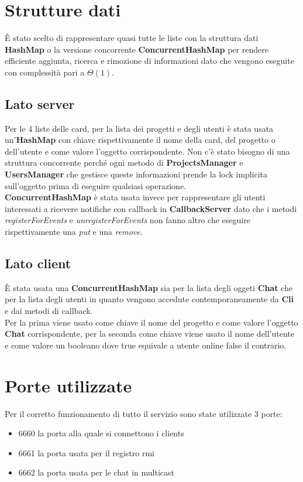 \documentclass[11pt]{report}
\begin{document}
	\section{Strutture dati}
	È stato scelto di rappresentare quasi tutte le liste con la struttura dati \textbf{HashMap} o la versione concorrente \textbf{ConcurrentHashMap} per rendere efficiente aggiunta, ricerca e rimozione di informazioni dato che vengono eseguite con complessità pari a $\Theta(1)$.\\
	
	\subsection{Lato server}
	Per le 4 liste delle card, per la lista dei progetti e degli utenti è stata usata un'\textbf{HashMap} con chiave rispettivamente il nome della card, del progetto o dell'utente e come valore l'oggetto corrispondente. Non c'è stato bisogno di una struttura concorrente perché ogni metodo di \textbf{ProjectsManager} e \textbf{UsersManager} che gestisce queste informazioni prende la lock implicita sull'oggetto prima di eseguire qualsiasi operazione.\\
	\textbf{ConcurrentHashMap} è stata usata invece per rappresentare gli utenti interessati a ricevere notifiche con callback in \textbf{CallbackServer} dato che i metodi \textit{registerForEvents} e \textit{unregisterForEvents} non fanno altro che eseguire rispettivamente una \textit{put} e una \textit{remove}.
	
	\subsection{Lato client}
	È stata usata una \textbf{ConcurrentHashMap} sia per la lista degli oggeti \textbf{Chat} che per la lista degli utenti in quanto vengono accedute contemporaneamente da \textbf{Cli} e dai metodi di callback.\\
	Per la prima viene usato come chiave il nome del progetto e come valore l'oggetto \textbf{Chat} corrispondente, per la seconda come chiave viene usato il nome dell'utente e come valore un booleano dove true equivale a utente online false il contrario.
	
	\section{Porte utilizzate}
	Per il corretto funzionamento di tutto il servizio sono state utilizzate 3 porte:
	\begin{itemize}
		\item 6660 la porta alla quale si connettono i clients
		\item 6661 la porta usata per il registro rmi
		\item 6662 la porta usata per le chat in multicast
	\end{itemize}
	
\end{document}
